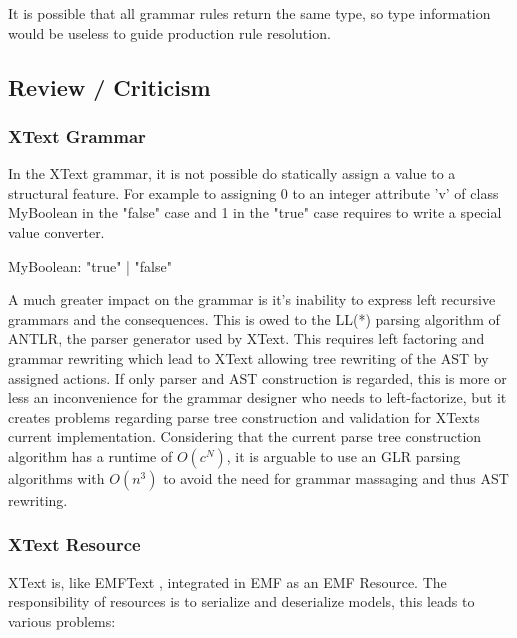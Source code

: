 It is possible that all grammar rules return the same type, so type information would be useless to guide production rule resolution.\\





\subsection{Review / Criticism}
\subsubsection{XText Grammar}
In the XText grammar, it is not possible do statically assign a value  to a structural feature. For example to assigning 0 to an integer attribute 'v' of class MyBoolean in the "false" case and 1 in the "true" case requires to write a special value converter. 
\begin{xtxt}
MyBoolean:  "true" | "false"
\end{xtxt}

A much greater impact on the grammar is it's inability to express left recursive grammars and the consequences. This is owed to the LL(*) parsing algorithm of ANTLR, the parser generator used by XText. This requires left factoring and grammar rewriting which lead to XText allowing tree rewriting of the AST by assigned actions. If only parser and AST construction is regarded, this is more or less an inconvenience for the grammar designer who needs to left-factorize, but it creates problems regarding parse tree construction and validation for XTexts current implementation. Considering that the current parse tree construction algorithm has a runtime of $O(c^N)$, it is arguable to use an GLR parsing algorithms with  $O(n^3)$ to avoid the need for grammar massaging and thus AST rewriting.

\subsubsection{XText Resource}
XText is, like EMFText \cite{EMFTextMan}, integrated in EMF as an EMF Resource. The responsibility of resources is to serialize and deserialize models, this leads to various problems: 


